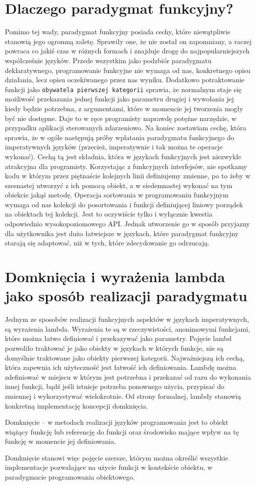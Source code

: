 \documentclass[a4paper,10pt]{report}
\begin{document}
\section{Dlaczego paradygmat funkcyjny?}
Pomimo tej wady, paradygmat funkcyjny posiada cechy, które niewątpliwie stanowią jego ogromną zaletę. Sprawiły one, że nie został on zapomniany, a raczej powraca co jakiś czas w różnych formach i znajduje drogę do najpopularniejszych współcześnie języków. Przede wszystkim jako podzbiór paradygmatu deklaratywnego, programowanie funkcyjne nie wymaga od nas, konkretnego opisu działania, lecz opisu oczekiwanego przez nas wyniku. Dodatkowo potraktowanie funkcji jako \verb|obywatela pierwszej kategorii| sprawia, że normalnym staje się możliwość przekazania jednej funkcji jako parametru drugiej i wywołania jej kiedy będzie potrzebna, z argumentami, które w momencie jej tworzenia mogły być nie dostępne. Daje to w ręce programisty naprawdę potężne narzędzie, w przypadku aplikacji sterowanych zdarzeniowo. Na koniec zostawiam cechę, która sprawia, że w ogóle następują próby wplatania paradygmatu funkcyjnego do imperatywnych języków (przecież, imperatywnie i tak można te operacje wykonać). Cechą tą jest składnia, która w językach funkcyjnych jest niezwykle atrakcyjna dla programisty. Korzystając z funkcyjnych interfejsów, nie spotkamy kodu w którym przez piętnaście kolejnych linii definiujemy zmienne, po to żeby w szesnastej utworzyć z ich pomocą obiekt, a w siedemnastej wykonać na tym obiekcie jakąś metodę. Operacja sortowania w programowaniu funkcyjnym wymaga od nas kolekcji do posortowania i funkcji definiującej liniowy porządek na obiektach tej kolekcji. Jest to oczywiście tylko i wyłącznie kwestia odpowiednio wysokopoziomowego API. Jednak utworzenie go w sposób przyjazny dla użytkownika jest dużo łatwiejsze w językach, które paradygmat funkcyjny starają się adaptować, niż w tych, które zdecydowanie go odrzucają.
\section{Domknięcia i wyrażenia lambda jako sposób realizacji paradygmatu}
Jednym ze sposobów realizacji funkcyjnych aspektów w językach imperatywnych, są wyrażenia lambda. Wyrażenia te są w rzeczywistości, anonimowymi funkcjami, które można łatwo definiować i przekazywać jako parametry. Pojęcie lambd pozwoliło traktować je jako obiekty w językach w których funkcje, nie są domyślnie traktowane jako obiekty pierwszej kategorii. Najważniejszą ich cechą, która zapewnia ich użyteczność jest łatwość ich definiowania. Lambdę można zdefiniować w miejscu w którym jest potrzebna i przekazać od razu do wykonania innej funkcji, bądź jeśli istnieje potrzeba ponownego użycia, przypisać do zmiennej i wykorzystywać wielokrotnie. Od strony formalnej, lambdy stanowią konkretną implementację koncepcji domknięcia.
\begin{theo}
Domknięcie – w metodach realizacji języków programowania jest to obiekt wiążący funkcję lub referencję do funkcji oraz środowisko mające wpływ na tę funkcję w momencie jej definiowania.
\end{theo}
Domknięcie stanowi więc pojęcie szersze, którym można określić wszystkie implementacje pozwalające na użycie funkcji w kontekście obiektu, w paradygmacie programowania obiektowego.
\end{document}
